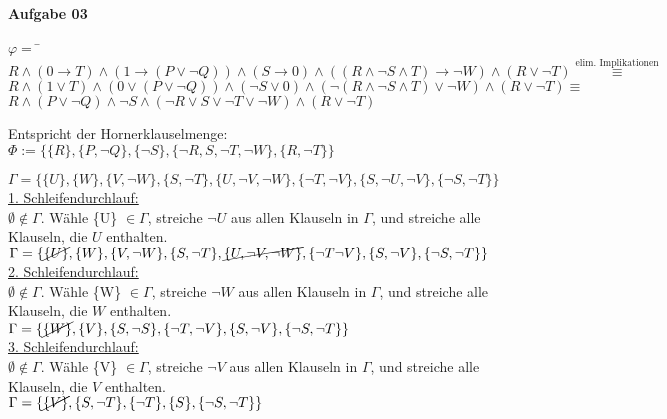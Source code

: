 \documentclass[a4paper,10pt]{article}
\begin{document}
	\newpage
	\textbf{Aufgabe 03}
	\begin{compactenum} [(a)]
		\item \begin{tabbing}
			$ \varphi = $ \= $R \wedge (0 \rightarrow T) \wedge (1 \rightarrow (P\vee \lnot Q)) \wedge (S \rightarrow 0) \wedge ((R \wedge \lnot S \wedge T) \rightarrow \lnot W) \wedge (R \vee \lnot T) \stackrel{\text{elim. Implikationen}}{\equiv}$ \\
			\> $ R \wedge (1 \vee T) \wedge (0 \vee (P \vee \lnot Q)) \wedge (\lnot S \vee 0) \wedge (\lnot (R \wedge \lnot S \wedge T) \vee \lnot W) \wedge (R \vee \lnot T) \equiv $ \\
			\> $ R \wedge (P \vee \lnot Q) \wedge \lnot S \wedge (\lnot R \vee S \vee \lnot T \vee \lnot W) \wedge (R \vee \lnot T) $
		\end{tabbing} 
		Entspricht der Hornerklauselmenge: \\
		$ \Phi := \{\{R\}, \{P,\lnot Q\},\{\lnot S\},\{\lnot R, S, \lnot T,\lnot W\},\{R,\lnot T\}\} $ \\
		
		\item $ \Gamma = \{\{U\}, \{W\}, \{V,\lnot W\}, \{S,\lnot T\},\{U,\lnot V, \lnot W\},\{\lnot T,\lnot V\},\{S,\lnot U,\lnot V\},\{\lnot S,\lnot T\}\} $\\
		
		\underline{1. Schleifendurchlauf: }\\
		$ \emptyset \not\in \Gamma. $ Wähle \{U\} $ \in \Gamma $, streiche $ \lnot U $ aus allen Klauseln in $ \Gamma $, und streiche alle Klauseln, die $ U $ enthalten.\\
		$ \Gamma = \{\cancel{\{U\}}, \{W\}, \{V, \lnot W\}, \{S,\lnot T\},\cancel{\{U, \lnot V, \lnot W\}}, \{\lnot T\lnot V\},\{S,\lnot V\},\{\lnot S, \lnot T\}\} $\\
		
		\underline{2. Schleifendurchlauf: }\\
		$ \emptyset \not\in \Gamma. $ Wähle \{W\} $ \in \Gamma $, streiche $ \lnot W $ aus allen Klauseln in $ \Gamma $, und streiche alle Klauseln, die $ W $ enthalten.\\
		$ \Gamma = \{\cancel{\{W\}},\{V\},\{S,\lnot S\},\{\lnot T, \lnot V\},\{S,\lnot V\},\{\lnot S,\lnot T\}\} $\\
		
		\underline{3. Schleifendurchlauf: }\\
		$ \emptyset \not\in \Gamma. $ Wähle \{V\} $ \in \Gamma $, streiche $ \lnot V $ aus allen Klauseln in $ \Gamma $, und streiche alle Klauseln, die $ V $ enthalten.\\
		$ \Gamma = \{\cancel{\{V\}}, \{S, \lnot T\}, \{\lnot T\}, \{S\}, \{\lnot S, \lnot T\}\} $\\
		

\end{compactenum}
\end{document}
